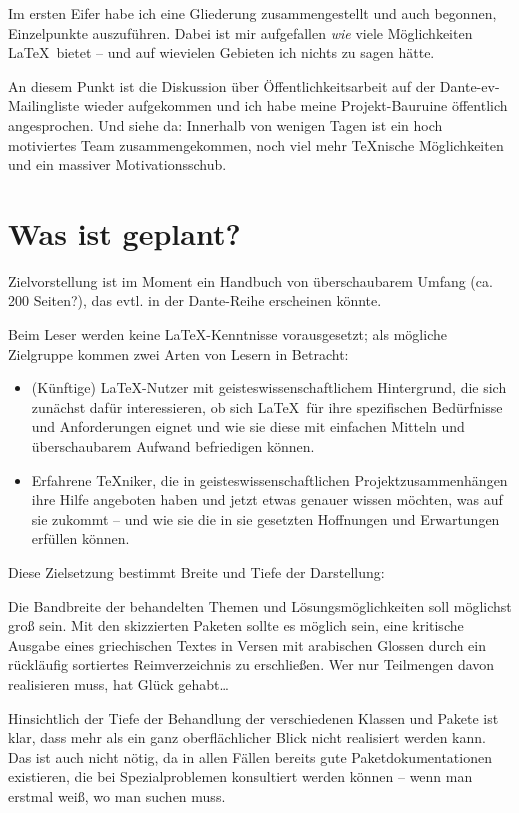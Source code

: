 \documentclass[ngerman]{dtk}
\begin{document}
Im ersten Eifer habe ich eine Gliederung zusammengestellt und auch begonnen, Einzelpunkte auszuführen.
Dabei ist mir aufgefallen \emph{wie} viele Möglichkeiten \LaTeX\ bietet -- und auf wievielen Gebieten ich nichts
zu sagen hätte.

An diesem Punkt ist die Diskussion über Öffentlichkeitsarbeit auf der Dante-ev-Mailingliste wieder aufgekommen
und ich habe meine Projekt-Bauruine öffentlich angesprochen. Und siehe da: Innerhalb von wenigen Tagen
ist ein hoch motiviertes Team zusammengekommen, noch viel mehr \TeX nische Möglichkeiten und ein
massiver Motivationsschub.


\section{Was ist geplant?}

Zielvorstellung ist im Moment ein Handbuch von überschaubarem Umfang (ca. 200 Seiten?), das evtl. in der 
Dante-Reihe erscheinen könnte.

Beim Leser werden keine \LaTeX -Kenntnisse vorausgesetzt; als mögliche Zielgruppe kommen zwei Arten von Lesern
in Betracht:

\begin{itemize}
    \item (Künftige) \LaTeX -Nutzer mit geisteswissenschaftlichem Hintergrund, die sich zunächst dafür
         interessieren, ob sich \LaTeX\ für ihre spezifischen Bedürfnisse und Anforderungen eignet und
         wie sie diese mit einfachen Mitteln und überschaubarem Aufwand befriedigen können.
    \item Erfahrene \TeX niker, die in geisteswissenschaftlichen Projektzusammenhängen ihre Hilfe angeboten
         haben und jetzt etwas genauer wissen möchten, was auf sie zukommt -- und wie sie die in sie
         gesetzten Hoffnungen und Erwartungen erfüllen können.
\end{itemize}
Diese Zielsetzung bestimmt Breite und Tiefe der Darstellung: 

Die Bandbreite der behandelten Themen und Lösungsmöglichkeiten soll möglichst groß sein.
Mit den skizzierten Paketen sollte es möglich sein, eine kritische Ausgabe eines griechischen Textes in Versen mit
arabischen Glossen durch ein rückläufig sortiertes Reimverzeichnis zu erschließen.
Wer nur Teilmengen davon realisieren muss, hat Glück gehabt\ldots

Hinsichtlich der Tiefe der Behandlung der verschiedenen Klassen und Pakete ist klar, dass mehr als ein
ganz oberflächlicher Blick nicht realisiert werden kann. Das ist auch nicht nötig, da in allen Fällen bereits
gute Paketdokumentationen existieren, die bei Spezialproblemen konsultiert werden können -- wenn man erstmal
weiß, wo man suchen muss.
\end{document}
